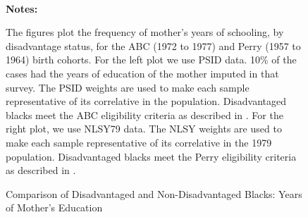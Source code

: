 \begin{figure} \begin{center}\centering
        \caption{Comparison of Disadvantaged and Non-Disadvantaged Blacks: Years of Mother's Education}
        \label{graph:abc_moedu_b}\vspace{0.2cm}
          \\
\end{center}
{\scriptsize {\bfseries Notes: } \raggedright 
The figures plot the frequency of mother's years of schooling, by disadvantage status, for the ABC (1972 to 1977) and Perry (1957 to 1964) birth cohorts. For the left plot we use PSID data. 10\% of the cases had the years of education of the mother imputed in that survey. The PSID weights are used to make each sample representative  of its correlative in the population. Disadvantaged blacks meet the  ABC eligibility criteria as described in \citet{Ramey_Smith_1977_AJMD}. For the right plot, we use NLSY79 data. The NLSY weights are used to make each sample representative  of its correlative in the 1979 population. Disadvantaged blacks meet the Perry eligibility criteria as described in \citet{heckman2010analyzing}.
}
\end{figure}

